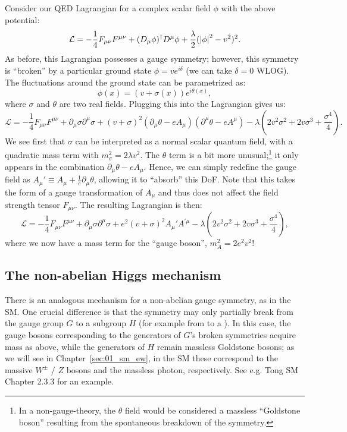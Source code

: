 Consider our QED Lagrangian for a complex scalar field $\phi$ with the above potential:
\begin{equation}
	\label{eq:01_qft_higgs_lagrangian}
	\mathcal L = -\frac{1}{4}F_{\mu\nu}F^{\mu\nu} + (D_\mu\phi)^\dagger D^\mu\phi + \frac{\lambda}{2}(\left\lvert \phi \right\rvert^2 - v^2)^2.
\end{equation}
As before, this Lagrangian possesses a \UU[1] gauge symmetry; however, this symmetry is ``broken'' by a particular ground state $\phi = v e^{i\delta}$ (we can take $\delta = 0$ WLOG).
The fluctuations around the ground state can be parametrized as:
\begin{equation}
	\label{eq:01_qft_higgs_fluctuations}
	\phi(x) = (v + \sigma(x))e^{i\theta(x)},
\end{equation}
where $\sigma$ and $\theta$ are two real fields.
Plugging this into the Lagrangian gives us:
\begin{equation}
	\label{eq:01_qft_higgs_fluctuations_lagrangian}
	\mathcal L = -\frac{1}{4}F_{\mu\nu}F^{\mu\nu} + \partial_\mu\sigma \partial^\mu\sigma + (v + \sigma)^2(\partial_\mu\theta - e A_\mu)(\partial^\mu\theta - e A^\mu) - \lambda(2v^2\sigma^2 + 2 v\sigma^3 + \frac{\sigma^4}{4}).
\end{equation}
We see first that $\sigma$ can be interpreted as a normal scalar quantum field, with a quadratic mass term with $m_\sigma^2 = 2\lambda v^2$.
The $\theta$ term is a bit more unusual;\footnote{In a non-gauge-theory, the $\theta$ field would be considered a massless ``Goldstone boson'' resulting from the spontaneous breakdown of the symmetry.}
it only appears in the combination $\partial_\mu\theta - e A_\mu$.
Hence, we can simply redefine the gauge field as $A_\mu' \equiv A_\mu + \frac{1}{e}\partial_\mu\theta$, allowing it to ``absorb'' this DoF.
Note that this takes the form of a gauge transformation of $A_\mu$ and thus does not affect the field strength tensor $F_{\mu\nu}$.
The resulting Lagrangian is then:
\begin{equation}
	\label{eq:01_qft_higgs_fluctuations_lagrangian_final}
	\mathcal L = -\frac{1}{4}F_{\mu\nu}F^{\mu\nu} + \partial_\mu\sigma \partial^\mu\sigma + e^2(v + \sigma)^2A_\mu'A^{'\mu} - \lambda(2v^2\sigma^2 + 2 v\sigma^3 + \frac{\sigma^4}{4}),
\end{equation}
where we now have a mass term for the ``gauge boson'', $m_A^2 = 2e^2 v^2$!

\subsection{The non-abelian Higgs mechanism}
\label{sec:01_qft_higgs_nonabelian}

There is an analogous mechanism for a non-abelian gauge symmetry, as in the SM.
One crucial difference is that the symmetry may only partially break from the gauge group $G$ to a subgroup $H$ (for example from \SU[2] to a \UU[1]).
In this case, the gauge bosons corresponding to the generators of $G$'s broken symmetries acquire mass as above, while the generators of $H$ remain massless Goldstone bosons; as we will see in Chapter~\ref{sec:01_sm_ew}, in the SM these correspond to the massive $W^\pm$ / $Z$ bosons and the massless photon, respectively.
See e.g. Tong SM~\cite{TongSM} Chapter 2.3.3 for an example.
